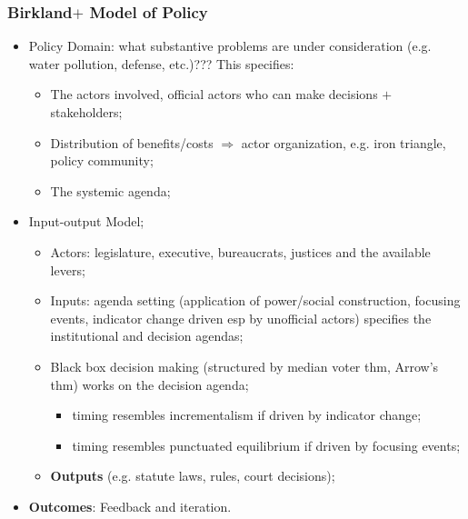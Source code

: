 \documentclass[aspectratio=169]{beamer}
\theoremstyle{principle}
\begin{document}
\begin{frame}
\frametitle{Birkland$+$ Model of Policy}
\begin{itemize}
\item Policy Domain: what substantive problems are under consideration (e.g. water pollution, defense, etc.)???  This specifies:
\begin{itemize}
\item The actors involved, official actors who can make decisions $+$ stakeholders; 
\item Distribution of benefits/costs $\Rightarrow$ actor organization, e.g. iron triangle, policy community;
\item The systemic agenda; 
\end{itemize}
\bigskip
\item \color{black}Input-output Model;
\begin{itemize}
\item Actors: legislature, executive, bureaucrats, justices and the available levers;
\item Inputs: agenda setting (application of power/social construction, focusing events, indicator change driven esp by unofficial actors) specifies the institutional and decision agendas;
\item Black box decision making (structured by median voter thm, Arrow's thm) works on the decision agenda;
\begin{itemize}
\item timing resembles incrementalism if driven by indicator change;
\item timing resembles punctuated equilibrium if driven by focusing events;
 \end{itemize}
\item \textbf{Outputs} (e.g. statute laws, rules, court decisions);
\end{itemize}
\bigskip
\item \textbf{Outcomes}: Feedback and iteration.
\end{itemize}
\end{frame}
\end{document}
